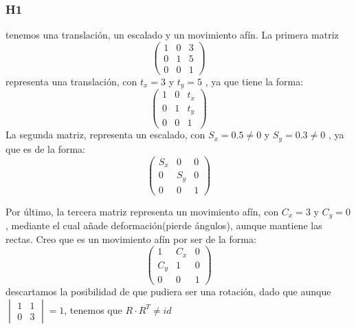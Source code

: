 \subsubsection{H1}
tenemos una translación, un escalado y un movimiento afín.
La primera matriz
 \begin{equation}
\begin{pmatrix}
  1 & 0 & 3\\ 0 & 1 & 5\\ 0 & 0 & 1
\end{pmatrix}
 \end{equation}
representa una translación, con $t_{x}=3$ y $t_{y}=5$ , ya que tiene la forma:
\begin{equation}
\begin{pmatrix}
 1 & 0 & t_{x}\\ 0 & 1 & t_{y}\\ 0 & 0 & 1
\end{pmatrix}
\end{equation}
La segunda matriz, representa un escalado, con $S_{x}=0.5\neq 0$ y $S_{y}=0.3\neq 0$ , ya que es  de la forma:
\begin{equation}
\begin{pmatrix}
 S_{x} & 0 & 0\\ 0 & S_{y} & 0\\ 0 & 0 & 1
\end{pmatrix}
\end{equation}

Por último, la tercera matriz representa un movimiento afín, con  $C_{x}=3$ y $C_{y}=0$, mediante el cual añade deformación(pierde ángulos), aunque mantiene las rectas.
Creo que es un movimiento afín por ser de la forma:
\begin{equation}
\begin{pmatrix}
 1 & C_{x} & 0\\ C_{y} & 1 & 0\\ 0 & 0 & 1
\end{pmatrix}
\end{equation} descartamos la posibilidad de que pudiera ser una rotación, dado que aunque $\begin{vmatrix} 1 &1 \\ 0&3 \end{vmatrix}=1$, tenemos que
 $R\cdot R^{T}\neq id$


